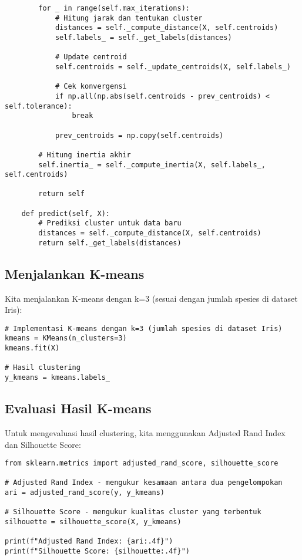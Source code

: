 \documentclass[a4paper,12pt]{article}
\begin{document}
\begin{lstlisting}
        for _ in range(self.max_iterations):
            # Hitung jarak dan tentukan cluster
            distances = self._compute_distance(X, self.centroids)
            self.labels_ = self._get_labels(distances)
            
            # Update centroid
            self.centroids = self._update_centroids(X, self.labels_)
            
            # Cek konvergensi
            if np.all(np.abs(self.centroids - prev_centroids) < self.tolerance):
                break
                
            prev_centroids = np.copy(self.centroids)
        
        # Hitung inertia akhir
        self.inertia_ = self._compute_inertia(X, self.labels_, self.centroids)
        
        return self
    
    def predict(self, X):
        # Prediksi cluster untuk data baru
        distances = self._compute_distance(X, self.centroids)
        return self._get_labels(distances)
\end{lstlisting}

\subsection{Menjalankan K-means}
Kita menjalankan K-means dengan k=3 (sesuai dengan jumlah spesies di dataset Iris):
\begin{lstlisting}
# Implementasi K-means dengan k=3 (jumlah spesies di dataset Iris)
kmeans = KMeans(n_clusters=3)
kmeans.fit(X)

# Hasil clustering
y_kmeans = kmeans.labels_
\end{lstlisting}

\subsection{Evaluasi Hasil K-means}
Untuk mengevaluasi hasil clustering, kita menggunakan Adjusted Rand Index dan Silhouette Score:
\begin{lstlisting}
from sklearn.metrics import adjusted_rand_score, silhouette_score

# Adjusted Rand Index - mengukur kesamaan antara dua pengelompokan
ari = adjusted_rand_score(y, y_kmeans)

# Silhouette Score - mengukur kualitas cluster yang terbentuk
silhouette = silhouette_score(X, y_kmeans)

print(f"Adjusted Rand Index: {ari:.4f}")
print(f"Silhouette Score: {silhouette:.4f}")
\end{lstlisting}
\end{document}
